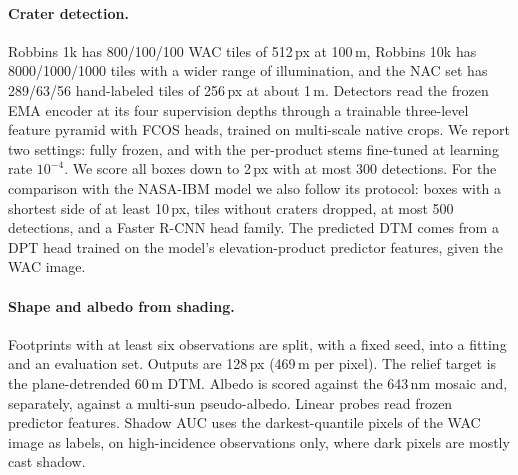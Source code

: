 \paragraph{Crater detection.} Robbins 1k has 800/100/100 WAC tiles of 512\,px at 100\,m, Robbins 10k has 8000/1000/1000 tiles with a wider range of illumination, and the NAC set has 289/63/56 hand-labeled tiles of 256\,px at about 1\,m. Detectors read the frozen EMA encoder at its four supervision depths through a trainable three-level feature pyramid with FCOS heads, trained on multi-scale native crops. We report two settings: fully frozen, and with the per-product stems fine-tuned at learning rate $10^{-4}$. We score all boxes down to 2\,px with at most 300 detections. For the comparison with the NASA-IBM model we also follow its protocol: boxes with a shortest side of at least 10\,px, tiles without craters dropped, at most 500 detections, and a Faster R-CNN head family. The predicted DTM comes from a DPT head trained on the model's elevation-product predictor features, given the WAC image.

\paragraph{Shape and albedo from shading.} Footprints with at least six observations are split, with a fixed seed, into a fitting and an evaluation set. Outputs are 128\,px (469\,m per pixel). The relief target is the plane-detrended 60\,m DTM. Albedo is scored against the 643\,nm mosaic and, separately, against a multi-sun pseudo-albedo. Linear probes read frozen predictor features. Shadow AUC uses the darkest-quantile pixels of the WAC image as labels, on high-incidence observations only, where dark pixels are mostly cast shadow. 
